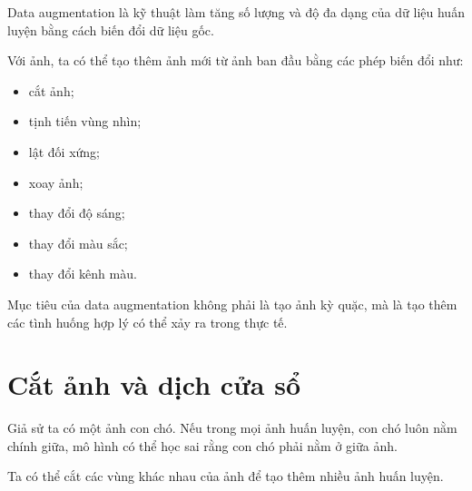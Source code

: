 \documentclass[12pt,a4paper]{report}
\begin{document}
Data augmentation là kỹ thuật làm tăng số lượng và độ đa dạng của dữ liệu huấn luyện bằng cách biến đổi dữ liệu gốc.

Với ảnh, ta có thể tạo thêm ảnh mới từ ảnh ban đầu bằng các phép biến đổi như:

\begin{itemize}
    \item cắt ảnh;
    \item tịnh tiến vùng nhìn;
    \item lật đối xứng;
    \item xoay ảnh;
    \item thay đổi độ sáng;
    \item thay đổi màu sắc;
    \item thay đổi kênh màu.
\end{itemize}

\begin{ghinho}
Mục tiêu của data augmentation không phải là tạo ảnh kỳ quặc, mà là tạo thêm các tình huống hợp lý có thể xảy ra trong thực tế.
\end{ghinho}

\section{Cắt ảnh và dịch cửa sổ}

Giả sử ta có một ảnh con chó. Nếu trong mọi ảnh huấn luyện, con chó luôn nằm chính giữa, mô hình có thể học sai rằng con chó phải nằm ở giữa ảnh.

Ta có thể cắt các vùng khác nhau của ảnh để tạo thêm nhiều ảnh huấn luyện.

\begin{center}
\end{center}
\end{document}
